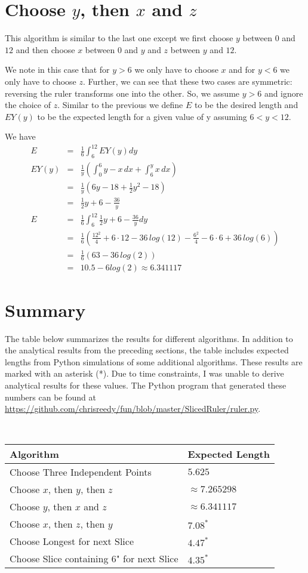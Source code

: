 \documentclass{article}
\begin{document}
\section{Choose $y$, then $x$ and $z$}

This algorithm is similar to the last one except we first choose $y$ between $0$ and $12$ and then choose $x$ between $0$ and $y$ and $z$
between $y$ and $12$.

We note in this case that for $y > 6$ we only have to choose $x$ and for $y < 6$ we only have to choose $z$. Further, we can see that these two
cases are symmetric: reversing the ruler transforms one into the other. So, we assume $y > 6$ and ignore the choice of $z$. Similar to the previous
we define $E$ to be the desired length and $EY(y)$ to be the expected length for a given value of y assuming $6 < y < 12$.

We have
\begin{eqnarray*}
E &=& \frac{1}{6} \int_{6}^{12} EY(y) dy\\
EY(y) &=& \frac{1}{y} \left( \int_{0}^{6} y-x \,dx + \int_{6}^{y} x \, dx \right)\\
&=& \frac{1}{y} \left( 6y - 18 + \frac{1}{2} y^2 - 18 \right)\\
&=& \frac{1}{2}y + 6 - \frac{36}{y}\\
E &=& \frac{1}{6} \int_{6}^{12}  \frac{1}{2}y + 6 - \frac{36}{y} dy\\
&=& \frac{1}{6} \left( \frac{12^2}{4} + 6 \cdot 12 - 36\,log(12) - \frac{6^2}{4} - 6 \cdot 6 + 36\,log(6)\right)\\
&=& \frac{1}{6} \left( 63 - 36 \, log(2) \right)\\
&=& 10.5 - 6 log(2) \approx 6.341117
\end{eqnarray*}

\section{Summary}

The table below summarizes the results for different algorithms. In addition to the analytical results from the preceding sections, the table includes
expected lengths from Python simulations of some additional algorithms. These results are marked with an asterisk (*). Due to time constraints,
I was unable to derive analytical results for these values. The Python program that generated these numbers can be 
found at \url{https://github.com/chrisreedy/fun/blob/master/SlicedRuler/ruler.py}.

\,

\begin{tabular}{l l}
\textbf{Algorithm} & \textbf{Expected Length} \\
\hline Choose Three Independent Points & $5.625$ \\
Choose $x$, then $y$, then $z$ & $\approx 7.265298$\\
Choose $y$, then $x$ and $z$ & $\approx 6.341117$\\
Choose $x$, then $z$, then $y$ & $7.08^*$ \\
Choose Longest for next Slice & $4.47^*$ \\
Choose Slice containing 6" for next Slice & $4.35^*$
\end {tabular}
\end{document}
